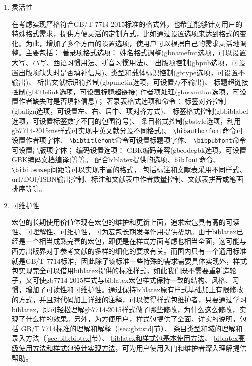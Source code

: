 \documentclass[11pt]{article} %
\begin{document}
\begin{enumerate}
  \item 灵活性

在考虑实现严格符合GB/T 7714-2015标准的格式外，也希望能够针对用户的特殊格式需求，提供方便灵活的定制方式，比如通过设置选项来达到格式的变化。为此，增加了多个方面的设置选项，使用户可以根据自己的需求灵活地调整。主要包括：
著录项格式选项：
姓名格式调整(gbnamefmt选项，可以设置大写、小写、西语习惯用法、拼音习惯用法)、
出版项控制(gbpub选项，可设置出版项缺失时是否填补信息)、类型和载体标识控制(gbtype选项，可设置不输出)、
析出文献标识符控制(gbpunctin选项，可设置\texttt{//}不输出)、
标题超链接控制(gbtitlelink选项，可设置标题超链接)
作者项处理(gbnoauthor选项，可设置作者缺失时是否填补信息)；
著录表格式选项和命令：
标签对齐控制(gbalign选项，可设置左、右、居中、项对齐方式)、
标签格式控制(gbbiblabel选项，可设置标签数字不同的包围符号)、
条目格式控制(gbstyle选项，利用gb7714-2015ms样式可实现中英文献分设不同格式)、
\verb|\bibauthorfont|命令可设置作者项字体、
\verb|\bibtitlefont|命令可设置标题项字体、
\verb|\bibpubfont|命令可设置出版项字体；
编码设置选项：
GBK编码兼容(gbcodegbk选项，可设置GBK编码文档编译)等等。
配合biblatex提供的选项、\verb|bibfont|命令、\verb|\bibitemsep|间距等可以实现丰富的格式，
包括标注和文献表采用不同样式、url/DOI/ISBN输出控制、标注和文献表中作者数量控制、文献表拼音或笔画排序等等。


  \item 可维护性

宏包的长期使用价值体现在宏包的维护和更新上面，追求宏包具有高的可读性、可理解性、可维护性，可为宏包长期发挥作用提供帮助。由于biblatex已经是一个相当成熟完善的宏包，即便是在样式方面考虑也相当全面，这可能与西方出版界对于参考文献的多样的细化的要求有关。而国内只有一个通用标准就是GB/T 7714标准，因此除了该标准一些特殊的需求需要具体实现外，样式包实现完全可以借用biblatex提供的标准样式，如此我们既不需要重新造轮子，又可使gb7714-2015样式与biblatex宏包样式保持一致的结构、风格、习惯，增加了可读性和可维护性。通过保持biblatex原有样式基础加上有限修改的方式，并且对代码加上详细的注释，可以使得样式包维护者，只要通过学习biblatex，即可轻松理解gb7714-2015样式做了哪些修改，为什么这么修改，实现了什么样的效果。另外，为方便用户，样式包提供了全面、详实的说明，包括
GB/T 7714标准的理解和解释（\ref{sec:gbt:std}节）、
条目类型和域的理解和录入方法（\ref{sec:bib:bibtex}节）、
\href{https://github.com/hushidong/biblatex-gb7714-2015/wiki}{biblatex和样式包基本使用方法}、
\href{https://github.com/hushidong/biblatex-solution-to-latex-bibliography/blob/master/biblatex-solution-to-latex-bibliography.pdf}%
{biblatex高级使用方法和样式包设计实现方法}，可为用户使用入门和维护者深入理解提供帮助。

\end{enumerate}
\end{document}
